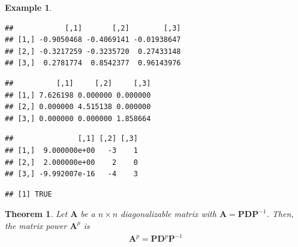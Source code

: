 \documentclass[
]{book}
\newenvironment{Shaded}{\begin{snugshade}}{\end{snugshade}}
\newcommand{\KeywordTok}[1]{\textcolor[rgb]{0.13,0.29,0.53}{\textbf{#1}}}
\newcommand{\NormalTok}[1]{#1}
\newcommand{\OperatorTok}[1]{\textcolor[rgb]{0.81,0.36,0.00}{\textbf{#1}}}
\newcommand{\StringTok}[1]{\textcolor[rgb]{0.31,0.60,0.02}{#1}}
\newtheorem{theorem}{Theorem}[chapter]
\theoremstyle{definition}
\theoremstyle{definition}
\newtheorem{example}{Example}[chapter]
\theoremstyle{definition}
\theoremstyle{definition}
\theoremstyle{remark}
\begin{document}
\begin{example}
\begin{verbatim}
##            [,1]       [,2]        [,3]
## [1,] -0.9050468 -0.4069141 -0.01938647
## [2,] -0.3217259 -0.3235720  0.27433148
## [3,]  0.2781774  0.8542377  0.96143976
\end{verbatim}

\begin{Shaded}
\end{Shaded}

\begin{verbatim}
##          [,1]     [,2]     [,3]
## [1,] 7.626198 0.000000 0.000000
## [2,] 0.000000 4.515138 0.000000
## [3,] 0.000000 0.000000 1.858664
\end{verbatim}

\begin{Shaded}
\end{Shaded}

\begin{verbatim}
##               [,1] [,2] [,3]
## [1,]  9.000000e+00   -3    1
## [2,]  2.000000e+00    2    0
## [3,] -9.992007e-16   -4    3
\end{verbatim}

\begin{Shaded}
\end{Shaded}

\begin{verbatim}
## [1] TRUE
\end{verbatim}

\end{example}

\begin{theorem}
Let \(\mathbf{A}\) be a \(n \times n\) diagonalizable matrix with \(\mathbf{A} = \mathbf{P} \mathbf{D} \mathbf{P}^{-1}\). Then, the matrix power \(\mathbf{A}^p\) is
\[
\begin{aligned}
\mathbf{A}^p = \mathbf{P} \mathbf{D}^p \mathbf{P}^{-1}
\end{aligned}
\]
\end{theorem}
\end{document}
